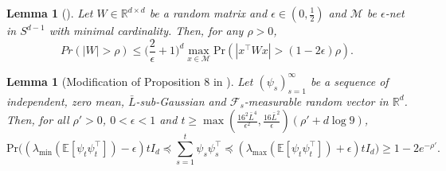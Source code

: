\documentclass[11pt]{article}
\theoremstyle{plain}
\newtheorem{lem}[thm]{Lemma}
\theoremstyle{definition}
\theoremstyle{remark}
\newcommand{\R}{\mathbb{R}}
\begin{document}
\begin{lem}[\cite{vershynin2018high}]\label{lem:epsilon-net}
Let $W \in \mathbb{R}^{d\times d}$ be a random matrix and $\epsilon \in (0,\frac{1}{2})$ and $\mathcal{M}$ be $\epsilon$-net in $S^{d-1}$ with minimal cardinality. Then, for any $\rho>0$,
\[
Pr(|W|>\rho) \leq \bigg(\frac{2}{\epsilon}+1\bigg)^d \max_{x\in \mathcal{M}} \mathrm{Pr}(|x^\top W x|>(1-2\epsilon) \rho).
\]
\end{lem}

\begin{lem}[Modification of Proposition 8 in \cite{jedra2022minimal}]\label{lem:noise_tail_bound}
Let $(\psi_s)_{s=1}^{\infty}$ be a sequence of independent, zero mean, $\bar L$-sub-Gaussian and $\mathcal{F}_{s}$-measurable random vector in $\R^{d}$. Then, for all $\rho'>0$, $0<\epsilon<1$ and $t \geq \max(\frac{16^2\bar{L}^4}{\epsilon^2}, \frac{16\bar{L}^2}{\epsilon})(\rho' +d \log 9)$,
\[
\mathrm{Pr}\bigg((\lambda_{\min}(\mathbb{E}[\psi_t \psi_t^{\top}])- \epsilon)tI_d\preceq \sum_{s=1}^t \psi_s \psi_s^{\top} \preceq (\lambda_{\max}(\mathbb{E}[\psi_t \psi_t^{\top}])+ \epsilon)tI_d\bigg)\geq 1-2e^{-\rho'}.
    \]
\end{lem}
\end{document}
